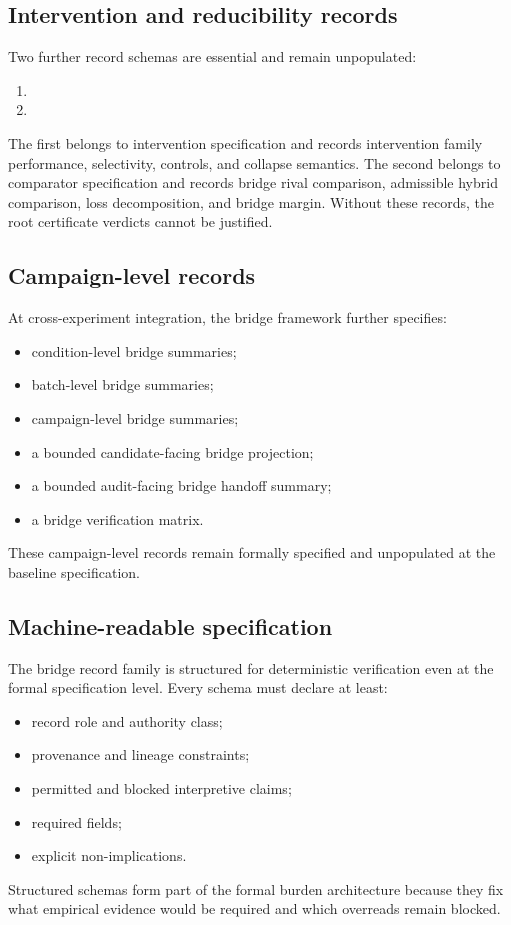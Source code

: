 \documentclass[11pt,a4paper]{article}
\theoremstyle{definition}
\begin{document}
\subsection{Intervention and reducibility records}
Two further record schemas are essential and remain unpopulated:
\begin{enumerate}[leftmargin=1.5em]
\item \texttt{\allowbreak{}\allowbreak{}\allowbreak{}}
\item \texttt{\allowbreak{}\allowbreak{}\allowbreak{}}
\end{enumerate}
The first belongs to intervention specification and records intervention family performance, selectivity, controls, and collapse semantics. The second belongs to comparator specification and records bridge rival comparison, admissible hybrid comparison, loss decomposition, and bridge margin. Without these records, the root certificate verdicts cannot be justified.

\subsection{Campaign-level records}
At cross-experiment integration, the bridge framework further specifies:
\begin{itemize}[leftmargin=1.5em]
\item condition-level bridge summaries;
\item batch-level bridge summaries;
\item campaign-level bridge summaries;
\item a bounded candidate-facing bridge projection;
\item a bounded audit-facing bridge handoff summary;
\item a bridge verification matrix.
\end{itemize}
These campaign-level records remain formally specified and unpopulated at the baseline specification.

\subsection{Machine-readable specification}
The bridge record family is structured for deterministic verification even at the formal specification level. Every schema must declare at least:
\begin{itemize}[leftmargin=1.5em]
\item record role and authority class;
\item provenance and lineage constraints;
\item permitted and blocked interpretive claims;
\item required fields;
\item explicit non-implications.
\end{itemize}
Structured schemas form part of the formal burden architecture because they fix what empirical evidence would be required and which overreads remain blocked.
\end{document}
